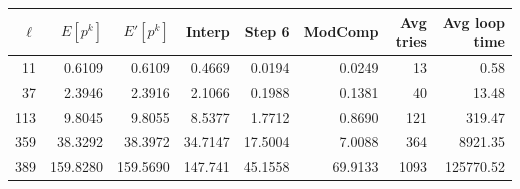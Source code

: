 \documentclass[10pt]{beamer}
\newcommand{\0}{\mathcal{O}}  %
\begin{document}
\begin{frame}
\begin{columns}
\begin{column}{0.6\textwidth}
    \end{column}
  \end{columns}
  
  \smallskip
  \footnotesize
  \centering
  \begin{tabular}{r r r r r r r r}
    \hline
    $\ell$ & $E[p^k]$ & $E'[p^k]$ & Interp & Step 6 & ModComp & Avg tries & Avg loop time\\
    \hline
    11 & 0.6109 & 0.6109 & 0.4669 & 0.0194 & 0.0249 & 13 & 0.58 \\
    37 & 2.3946 & 2.3916 & 2.1066 & 0.1988 & 0.1381 & 40 & 13.48 \\
    113 & 9.8045 & 9.8055 & 8.5377 & 1.7712 & 0.8690 & 121 & 319.47 \\
    359 & 38.3292 & 38.3972 & 34.7147 & 17.5004 & 7.0088 & 364 & 8921.35 \\ 
    389 & 159.8280 & 159.5690 & 147.741 & 45.1558 & 69.9133 & 1093 & 125770.52  \\   
    \hline
  \end{tabular}
\end{frame}

\end{document}
